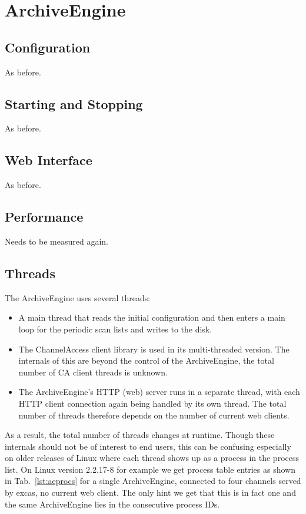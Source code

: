 \chapter{ArchiveEngine}

\section{Configuration}
As before.

\section{Starting and Stopping}
As before.

\section{Web Interface}
As before.

\section{Performance}
Needs to be measured again.

\section{Threads}
The ArchiveEngine uses several threads:
\begin{itemize}
\item A main thread that reads the initial configuration and then
  enters a main loop for the periodic scan lists and writes to the
  disk.
\item The ChannelAccess client library is used in its multi-threaded
  version. The internals of this are beyond the control of the
  ArchiveEngine, the total number of CA client threads is unknown.
\item The ArchiveEngine's HTTP (web) server runs in a separate thread,
  with each HTTP client connection again being handled by its own
  thread. The total number of threads therefore depends on the number
  of current web clients.
\end{itemize}
As a result, the total number of threads changes at runtime. Though
these internals should not be of interest to end users, this can be
confusing especially on older releases of Linux where each thread
shows up as a process in the process list.
On Linux version 2.2.17-8 for example we get process table entries as
shown in Tab.~\ref{lst:aeprocs} for a single ArchiveEngine, connected
to four channels served by excas, no current web client. The only hint
we get that this is in fact one and the same ArchiveEngine lies in the
consecutive process IDs.

